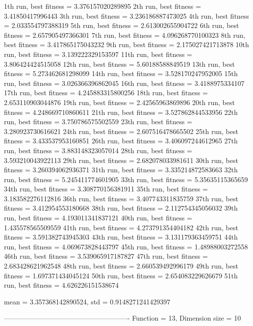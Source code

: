 1th run, best fitness = 3.376157020289895
2th run, best fitness = 3.41850417996443
3th run, best fitness = 3.236186887473025
4th run, best fitness = 2.033554797388319
5th run, best fitness = 2.613002655904722
6th run, best fitness = 2.657905497366301
7th run, best fitness = 4.096268770100323
8th run, best fitness = 3.417865175043232
9th run, best fitness = 2.175027421713878
10th run, best fitness = 3.139222329153597
11th run, best fitness = 3.806424424515058
12th run, best fitness = 5.60188588849519
13th run, best fitness = 5.273462681298099
14th run, best fitness = 3.528170247952005
15th run, best fitness = 3.026366396862045
16th run, best fitness = 3.4188975334107
17th run, best fitness = 4.245883315800256
18th run, best fitness = 2.653110903044876
19th run, best fitness = 2.42565963869896
20th run, best fitness = 4.248669710860611
21th run, best fitness = 3.527862844533956
22th run, best fitness = 3.750786575502559
23th run, best fitness = 3.280923730616621
24th run, best fitness = 2.607516478665502
25th run, best fitness = 3.433537953160851
26th run, best fitness = 3.406097244612965
27th run, best fitness = 3.883148323057014
28th run, best fitness = 3.593210043922113
29th run, best fitness = 2.682078033981611
30th run, best fitness = 3.260394062936371
31th run, best fitness = 3.335214872583663
32th run, best fitness = 5.245411774601905
33th run, best fitness = 5.35635115365659
34th run, best fitness = 3.308770156381911
35th run, best fitness = 3.183582276112816
36th run, best fitness = 3.407743311835759
37th run, best fitness = 3.412954553180668
38th run, best fitness = 2.112754345056032
39th run, best fitness = 4.193011341837121
40th run, best fitness = 1.435578565509559
41th run, best fitness = 4.273791354404182
42th run, best fitness = 3.591382743945303
43th run, best fitness = 3.131179363459751
44th run, best fitness = 4.069673828443797
45th run, best fitness = 1.48988003272558
46th run, best fitness = 3.539065917187827
47th run, best fitness = 2.683428621962548
48th run, best fitness = 2.660539492996179
49th run, best fitness = 1.697371434045124
50th run, best fitness = 2.654083229626679
51th run, best fitness = 4.626226151538674

mean = 3.357368142890524, std = 0.9148271241429397

-------------------------------------------------------
Function = 13, Dimension size = 10

